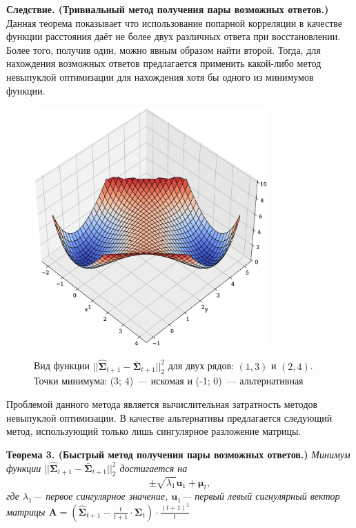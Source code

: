 \documentclass{article}
\begin{document}
\textbf{Следствие. (Тривиальный метод получения пары возможных ответов.)} Данная теорема показывает что использование попарной корреляции в качестве функции расстояния даёт не более двух различных ответа при восстановлении. Более того, получив один, можно явным образом найти второй. Тогда, для нахождения возможных ответов предлагается применить какой-либо метод невыпуклой оптимизации для нахождения хотя бы одного из минимумов функции.

\begin{figure}[H]
	\centering
	\begin{center}
		\includegraphics[width=0.8\textwidth]{NonConvex.eps}
		\label{fig:fig5}
	\end{center}
	\caption{Вид функции $||\hat{\mathbf{\Sigma}}_{t+1} - \bar{\mathbf{\Sigma}}_{t+1}||_2^2$ для двух рядов: $(1, 3)$ и $(2, 4)$. Точки минимума: (3; 4)~--- искомая и (-1; 0)~--- альтернативная}
\end{figure}


Проблемой данного метода является вычислительная затратность методов невыпуклой оптимизации. В качестве альтернативы предлагается следующий метод, использующий только лишь сингулярное разложение матрицы.

\textbf{Теорема 3. (Быстрый метод получения пары возможных ответов.)} \textit{Минимум функции $||\hat{\mathbf{\Sigma}}_{t+1} - \bar{\mathbf{\Sigma}}_{t+1}||_2^2$ достигается на \[\pm\sqrt{\lambda_1} \mathbf{u}_1 + \boldsymbol{\mu}_t,\] где $\lambda_1$--- первое сингулярное значение, $\mathbf{u}_1$--- первый левый сигнулярный вектор матрицы $\mathbf{A}=\left(\hat{\mathbf{\Sigma}}_{t+1} - \frac{t}{t+1} \cdot \mathbf{\Sigma}_t \right) \cdot \frac{(t+1)^2}{t}$}
\end{document}
